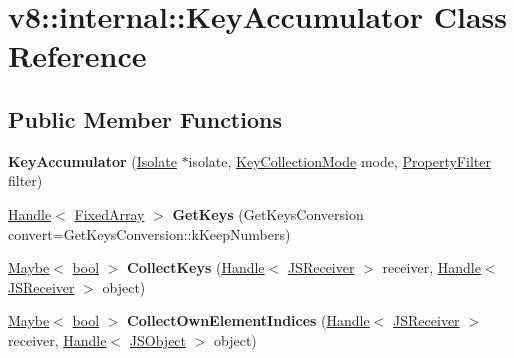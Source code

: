 \hypertarget{classv8_1_1internal_1_1KeyAccumulator}{}\section{v8\+:\+:internal\+:\+:Key\+Accumulator Class Reference}
\label{classv8_1_1internal_1_1KeyAccumulator}
\subsection*{Public Member Functions}
\begin{DoxyCompactItemize}
\item 
\mbox{\label{classv8_1_1internal_1_1KeyAccumulator_ac61234ee22ea8ba2fb942e77bbd7f127}} 
{\bfseries Key\+Accumulator} (\mbox{\hyperlink{classv8_1_1internal_1_1Isolate}{Isolate}} $\ast$isolate, \mbox{\hyperlink{namespacev8_a0cee20f5c7f0d59d0835af8e537388dc}{Key\+Collection\+Mode}} mode, \mbox{\hyperlink{namespacev8_afbf02b6b1152a3e25d7bde90798209ac}{Property\+Filter}} filter)
\item 
\mbox{\label{classv8_1_1internal_1_1KeyAccumulator_a743c884f8a9cee6d024cc6979c5859db}} 
\mbox{\hyperlink{classv8_1_1internal_1_1Handle}{Handle}}$<$ \mbox{\hyperlink{classv8_1_1internal_1_1FixedArray}{Fixed\+Array}} $>$ {\bfseries Get\+Keys} (Get\+Keys\+Conversion convert=Get\+Keys\+Conversion\+::k\+Keep\+Numbers)
\item 
\mbox{\label{classv8_1_1internal_1_1KeyAccumulator_acdcd386e9a17db7bfd964c5a944eb327}} 
\mbox{\hyperlink{classv8_1_1Maybe}{Maybe}}$<$ \mbox{\hyperlink{classbool}{bool}} $>$ {\bfseries Collect\+Keys} (\mbox{\hyperlink{classv8_1_1internal_1_1Handle}{Handle}}$<$ \mbox{\hyperlink{classv8_1_1internal_1_1JSReceiver}{J\+S\+Receiver}} $>$ receiver, \mbox{\hyperlink{classv8_1_1internal_1_1Handle}{Handle}}$<$ \mbox{\hyperlink{classv8_1_1internal_1_1JSReceiver}{J\+S\+Receiver}} $>$ object)
\item 
\mbox{\label{classv8_1_1internal_1_1KeyAccumulator_a45add4e6e8d6edbc6dce9251696457a2}} 
\mbox{\hyperlink{classv8_1_1Maybe}{Maybe}}$<$ \mbox{\hyperlink{classbool}{bool}} $>$ {\bfseries Collect\+Own\+Element\+Indices} (\mbox{\hyperlink{classv8_1_1internal_1_1Handle}{Handle}}$<$ \mbox{\hyperlink{classv8_1_1internal_1_1JSReceiver}{J\+S\+Receiver}} $>$ receiver, \mbox{\hyperlink{classv8_1_1internal_1_1Handle}{Handle}}$<$ \mbox{\hyperlink{classv8_1_1internal_1_1JSObject}{J\+S\+Object}} $>$ object)

\end{DoxyCompactItemize}

